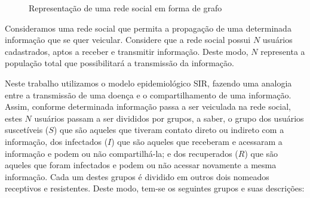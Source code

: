 \documentclass[
	12pt,				%
	openright,			%
	oneside,			%
	a4paper,			%
	english,			%
	french,				%
	spanish,			%
	brazil				%
	]{abntex2}
\begin{document}
\begin{center}
    \begin{figure}
      \begin{center}
        \setlength\fboxsep{0pt}
        \setlength\fboxrule{0pt}
        \caption{Representação de uma rede social em forma de grafo}
        \label{fig:grafo}
      \end{center}
    \end{figure}
\end{center}

Consideramos uma rede social que permita a propagação de uma
determinada informação que se quer veicular. Considere que a rede
social possui $N$ usuários cadastrados, aptos a receber e transmitir
informação. Deste modo, $N$ representa a população total que
possibilitará a transmissão da informação.

Neste trabalho utilizamos o modelo epidemiológico
SIR\cite{hethcote2000}, fazendo uma analogia entre a transmissão de
uma doença e o compartilhamento de uma informação.  Assim, conforme
determinada informação passa a ser veiculada na rede social, estes $N$
usuários passam a ser divididos por grupos, a saber, o grupo dos
usuários suscetíveis ($S$) que são aqueles que tiveram contato direto
ou indireto com a informação, dos infectados ($I$) que são aqueles que
receberam e acessaram a informação e podem ou não compartilhá-la; e
dos recuperados ($R$) que são aqueles que foram infectados e podem ou
não acessar novamente a mesma informação. Cada um destes grupos é
dividido em outros dois nomeados receptivos e resistentes. Deste modo,
tem-se os seguintes grupos e suas descrições:
\end{document}
